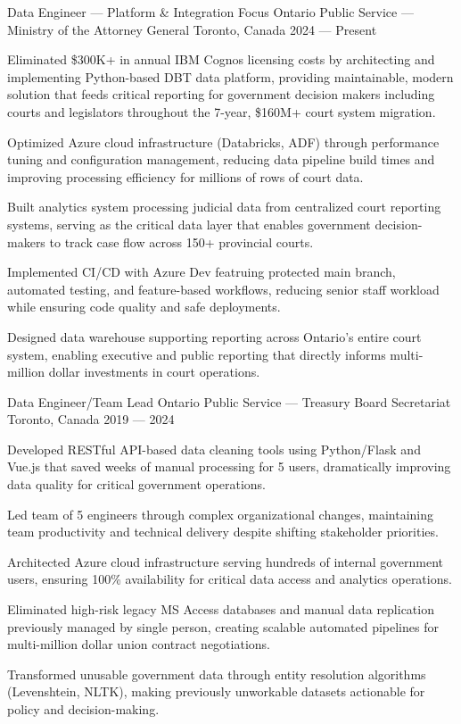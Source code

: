 \begin{cventries}

\cventry%
	{Data Engineer --- Platform \& Integration Focus}
	{Ontario Public Service --- Ministry of the Attorney General}
	{Toronto, Canada}
	{2024 --- Present}
	{
		\begin{cvitems}
			\item Eliminated \$300K+ in annual IBM Cognos licensing costs by architecting and implementing Python-based DBT data platform, providing maintainable, modern solution that feeds critical reporting for government decision makers including courts and legislators throughout the 7-year, \$160M+ court system migration.
			\item Optimized Azure cloud infrastructure (Databricks, ADF) through performance tuning and configuration management, reducing data pipeline build times and improving processing efficiency for millions of rows of court data.
			\item Built analytics system processing judicial data from centralized court reporting systems, serving as the critical data layer that enables government decision-makers to track case flow across 150+ provincial courts.
			\item Implemented CI/CD with Azure Dev featruing protected main branch, automated testing, and feature-based workflows, reducing senior staff workload while ensuring code quality and safe deployments.
			\item Designed data warehouse supporting reporting across Ontario's entire court system, enabling executive and public reporting that directly informs multi-million dollar investments in court operations.
		\end{cvitems}
	}

\cventry%
	{Data Engineer/Team Lead}
	{Ontario Public Service --- Treasury Board Secretariat}
	{Toronto, Canada}
	{2019 --- 2024}
	{
		\begin{cvitems}
			\item Developed RESTful API-based data cleaning tools using Python/Flask and Vue.js that saved weeks of manual processing for 5 users, dramatically improving data quality for critical government operations.
			\item Led team of 5 engineers through complex organizational changes, maintaining team productivity and technical delivery despite shifting stakeholder priorities.
			\item Architected Azure cloud infrastructure serving hundreds of internal government users, ensuring 100\% availability for critical data access and analytics operations.
			\item Eliminated high-risk legacy MS Access databases and manual data replication previously managed by single person, creating scalable automated pipelines for multi-million dollar union contract negotiations.
			\item Transformed unusable government data through entity resolution algorithms (Levenshtein, NLTK), making previously unworkable datasets actionable for policy and decision-making.
		\end{cvitems}
	}


\end{cventries}
